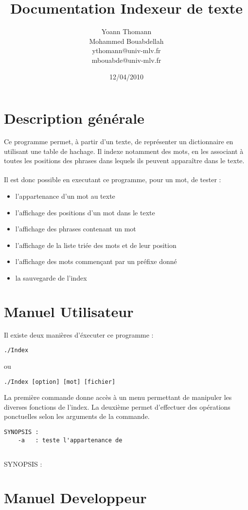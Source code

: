 \documentclass[french, 12pt, titlepage]{article}
\author{Yoann Thomann\\Mohammed Bouabdellah\\\scriptsize ythomann@univ-mlv.fr\\\scriptsize mbouabde@univ-mlv.fr}
\date{12/04/2010}
\title{\Huge Documentation Indexeur de texte}
\begin{document}
\vspace{\fill}
\maketitle
\newpage
\tableofcontents
\newpage
\section{Description générale}
Ce programme permet, à partir d'un texte, de représenter un dictionnaire en utilisant une table de hachage. Il indexe notamment des mots, en les associant 
à toutes les positions des phrases dans lequels ils peuvent apparaître dans le texte. \\\\
Il est donc possible en executant ce programme, pour un mot, de tester :
\begin{itemize}
\renewcommand{\labelitemi}{$\bullet$}
\item l'appartenance d'un mot au texte
\item l'affichage des positions d'un mot dans le texte
\item l'affichage des phrases contenant un mot
\item l'affichage de la liste triée des mots et de leur position
\item l'affichage des mots commençant par un préfixe donné
\item la sauvegarde de l'index
\end{itemize}

\section{Manuel Utilisateur}
Il existe deux manières d'éxecuter ce programme :
\begin{verbatim}
./Index
\end{verbatim}
ou
\begin{verbatim}
./Index [option] [mot] [fichier]
\end{verbatim}
La première commande donne accès à un menu permettant de manipuler les diverses fonctions de l'index.
La deuxième permet d'effectuer des opérations ponctuelles selon les arguments de la commande.
\begin{verbatim}
SYNOPSIS :
    -a   : teste l'appartenance de 
   
\end{verbatim}
SYNOPSIS :
\section{Manuel Developpeur}
\end{document}
